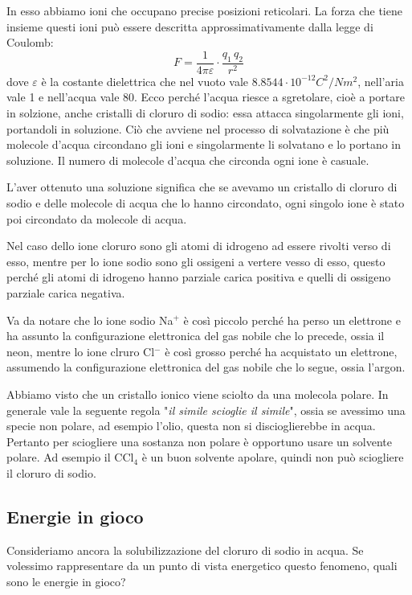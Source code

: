 In esso abbiamo ioni che occupano precise posizioni reticolari. La forza che tiene insieme questi ioni può essere descritta approssimativamente dalla legge di Coulomb:
$$\displaystyle F= \frac{1}{4 \pi \varepsilon} \cdot \frac{q_1 \, q_2}{r^2}$$
dove $\varepsilon$ è la costante dielettrica che nel vuoto vale $8.8544 \cdot 10^{-12} C^2/Nm^2$, nell'aria vale 1 e nell'acqua vale 80. Ecco perché l'acqua riesce a sgretolare, cioè a portare in solzione, anche cristalli di cloruro di sodio: essa attacca singolarmente gli ioni, portandoli in soluzione. Ciò che avviene nel processo di solvatazione è che più molecole d'acqua circondano gli ioni e singolarmente li solvatano e lo portano in soluzione. Il numero di molecole d'acqua che circonda ogni ione è casuale.

L'aver ottenuto una soluzione significa che se avevamo un cristallo di cloruro di sodio e delle molecole di acqua che lo hanno circondato, ogni singolo ione è stato poi circondato da molecole di acqua.

Nel caso dello ione cloruro sono gli atomi di idrogeno ad essere rivolti verso di esso, mentre per lo ione sodio sono gli ossigeni a vertere vesso di esso, questo perché gli atomi di idrogeno hanno parziale carica positiva e quelli di ossigeno parziale carica negativa.

Va da notare che lo ione sodio Na$^+$ è così piccolo perché ha perso un elettrone e ha assunto la configurazione elettronica del gas nobile che lo precede, ossia il neon, mentre lo ione clruro Cl$^-$ è così grosso perché ha acquistato un elettrone, assumendo la configurazione elettronica del gas nobile che lo segue, ossia l'argon.

\vspace{0.2cm}Abbiamo visto che un cristallo ionico viene sciolto da una molecola polare. In generale vale la seguente regola "\textit{il simile scioglie il simile}", ossia se avessimo una specie non polare, ad esempio l'olio, questa non si discioglierebbe in acqua. Pertanto per sciogliere una sostanza non polare è opportuno usare un solvente polare. Ad esempio il CCl$_4$ è un buon solvente apolare, quindi non può sciogliere il cloruro di sodio.

\subsection{Energie in gioco}

Consideriamo ancora la solubilizzazione del cloruro di sodio in acqua. Se volessimo rappresentare da un punto di vista energetico questo fenomeno, quali sono le energie in gioco?

